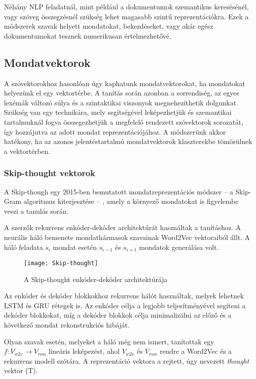 Néhány NLP feladatnál, mint például a dokumentumok szemantikus keresésénél, vagy szöveg összegzésnél szükség lehet magasabb szintű reprezentációkra.  Ezek a módszerek szavak helyett mondatokat, bekezdéseket, vagy akár egész dokumentumokat tesznek numerikusan értelmezhetővé. 

\subsection{Mondatvektorok}
A szóvektorokhoz hasonlóan úgy kaphatunk mondatvektorokat, ha mondatokat helyezünk el egy vektortérbe. A tanítás során azonban a sorrendiség, az egyes lexémák változó súlya és a szintaktikai viszonyok megnehezíthetik dolgunkat. Szükség van egy technikára, mely segítségével leképezhetjük és szemantikai tartalmuknál fogva összegezhetjük a megfelelő rendezett szóvektorok sorozatát, így hozzájutva az adott mondat reprezentációjához. A módszerünk akkor hatékony, ha az azonos jelentéstartalmú mondatvektorok klaszterekbe tömörülnek a vektortérben.

\subsubsection{Skip-thought vektorok}
A Skip-though \cite{skip} egy 2015-ben bemutatott mondatreprezentációs módszer – a Skip-Gram algoritmus kiterjesztése – , amely a környező mondatokat is figyelembe veszi a tanulás során. 

A szerzők rekurrens enkóder-dekóder architektúrát használtak a tanításhoz. A neurális háló bemenete mondathármasok szavainak Word2Vec vektoraiból állt. A háló feladata $s_i$ mondat esetén $s_{i-1}$ és $s_{i+1}$ mondatok generálása volt.

\begin{figure}[H]
	\centering
	\texttt{[image: Skip-thought]}
	\caption{A Skip-thought enkóder-dekóder architektúrája}
\end{figure}

Az enkóder és dekóder blokkokhoz rekurrens hálót használtak, melyek lehetnek LSTM és GRU rétegek is. Az enkóder célja a legjobb teljesítményével segíteni a dekóder blokkokat, míg a dekóder blokkok célja minimalizálni az előző és a következő mondat rekonstrukciós hibáját.


Olyan szavak esetén, melyeket a háló még nem ismert, tanítottak egy $f:V_{w2v} \rightarrow V_{rnn}$ lineáris leképezést, ahol $V_{w2v}$ és $V_{rnn}$ rendre a Word2Vec és a rekurrens modell szótára. A reprezentáció vektora a rejtett, úgy nevezett \textit{thought} vektor (T).


